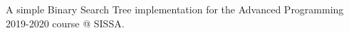 A simple Binary Search Tree implementation for the Advanced Programming 2019-\/2020 course @ S\+I\+S\+SA. 